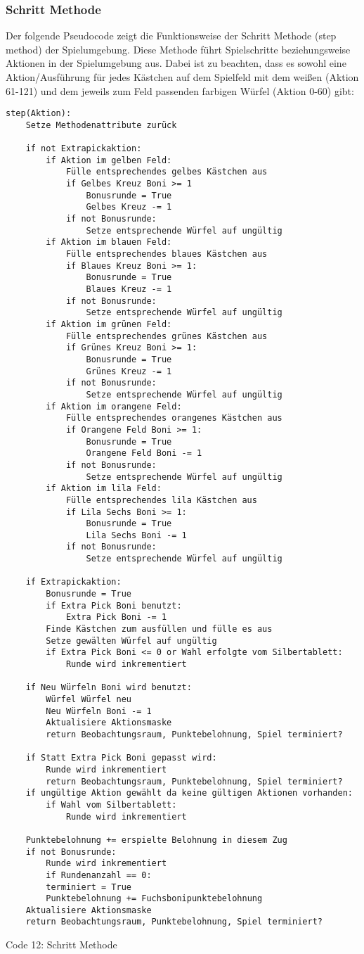 \subsubsection{Schritt Methode}
Der folgende Pseudocode zeigt die Funktionsweise der Schritt Methode (step method) der Spielumgebung. Diese Methode führt Spielschritte beziehungsweise Aktionen in der Spielumgebung aus. Dabei ist zu beachten, dass es sowohl eine Aktion/Ausführung für jedes Kästchen auf dem Spielfeld mit dem weißen (Aktion 61-121) und dem jeweils zum Feld passenden farbigen Würfel (Aktion 0-60) gibt:
\vspace{0.5cm}
\begin{lstlisting}
step(Aktion):
	Setze Methodenattribute zurück
	
	if not Extrapickaktion:
		if Aktion im gelben Feld:
			Fülle entsprechendes gelbes Kästchen aus
			if Gelbes Kreuz Boni >= 1
				Bonusrunde = True
				Gelbes Kreuz -= 1
			if not Bonusrunde:
				Setze entsprechende Würfel auf ungültig
		if Aktion im blauen Feld:
			Fülle entsprechendes blaues Kästchen aus
			if Blaues Kreuz Boni >= 1:
				Bonusrunde = True
				Blaues Kreuz -= 1
			if not Bonusrunde:
				Setze entsprechende Würfel auf ungültig
		if Aktion im grünen Feld:
			Fülle entsprechendes grünes Kästchen aus
			if Grünes Kreuz Boni >= 1:
				Bonusrunde = True
				Grünes Kreuz -= 1
			if not Bonusrunde:
				Setze entsprechende Würfel auf ungültig
		if Aktion im orangene Feld:
			Fülle entsprechendes orangenes Kästchen aus
			if Orangene Feld Boni >= 1:
				Bonusrunde = True
				Orangene Feld Boni -= 1
			if not Bonusrunde:
				Setze entsprechende Würfel auf ungültig
		if Aktion im lila Feld:
			Fülle entsprechendes lila Kästchen aus
			if Lila Sechs Boni >= 1:
				Bonusrunde = True
				Lila Sechs Boni -= 1
			if not Bonusrunde:
				Setze entsprechende Würfel auf ungültig
	
	if Extrapickaktion:
		Bonusrunde = True
		if Extra Pick Boni benutzt:
			Extra Pick Boni -= 1
		Finde Kästchen zum ausfüllen und fülle es aus
		Setze gewälten Würfel auf ungültig
		if Extra Pick Boni <= 0 or Wahl erfolgte vom Silbertablett:
			Runde wird inkrementiert
			
	if Neu Würfeln Boni wird benutzt:
		Würfel Würfel neu
		Neu Würfeln Boni -= 1
		Aktualisiere Aktionsmaske
		return Beobachtungsraum, Punktebelohnung, Spiel terminiert?
		
	if Statt Extra Pick Boni gepasst wird:
		Runde wird inkrementiert
		return Beobachtungsraum, Punktebelohnung, Spiel terminiert?
	if ungültige Aktion gewählt da keine gültigen Aktionen vorhanden:
		if Wahl vom Silbertablett:
			Runde wird inkrementiert
			
	Punktebelohnung += erspielte Belohnung in diesem Zug
	if not Bonusrunde:
		Runde wird inkrementiert
		if Rundenanzahl == 0:
		terminiert = True
		Punktebelohnung += Fuchsbonipunktebelohnung
	Aktualisiere Aktionsmaske
	return Beobachtungsraum, Punktebelohnung, Spiel terminiert?		
\end{lstlisting}
Code 12: Schritt Methode\\

